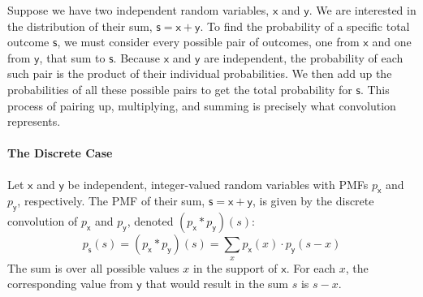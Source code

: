 Suppose we have two independent random variables, $\mathsf{x}$ and $\mathsf{y}$. We are interested in the distribution of their sum, $\mathsf{s} = \mathsf{x} + \mathsf{y}$. To find the probability of a specific total outcome $\mathsf{s}$, we must consider every possible pair of outcomes, one from $\mathsf{x}$ and one from $\mathsf{y}$, that sum to $\mathsf{s}$. Because $\mathsf{x}$ and $\mathsf{y}$ are independent, the probability of each such pair is the product of their individual probabilities. We then add up the probabilities of all these possible pairs to get the total probability for $\mathsf{s}$. This process of pairing up, multiplying, and summing is precisely what convolution represents.

\paragraph*{The Discrete Case}
Let $\mathsf{x}$ and $\mathsf{y}$ be independent, integer-valued random variables with PMFs $p_{\mathsf{x}}$ and $p_{\mathsf{y}}$, respectively. The PMF of their sum, $\mathsf{s} = \mathsf{x} + \mathsf{y}$, is given by the discrete convolution of $p_{\mathsf{x}}$ and $p_{\mathsf{y}}$, denoted $(p_{\mathsf{x}} * p_{\mathsf{y}})(s)$:
\begin{equation}
    p_{\mathsf{s}}(s) = (p_{\mathsf{x}} * p_{\mathsf{y}})(s) = \sum_{x} p_{\mathsf{x}}(x) \cdot p_{\mathsf{y}}(s-x)
\end{equation}
The sum is over all possible values $x$ in the support of $\mathsf{x}$. For each $x$, the corresponding value from $\mathsf{y}$ that would result in the sum $s$ is $s-x$.

